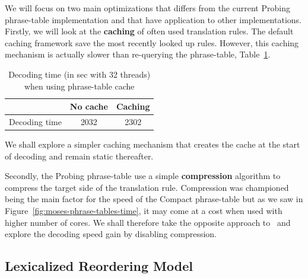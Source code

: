 \documentclass[11pt]{article}
\begin{document}
We will focus on two main optimizations that differs from the current Probing phrase-table implementation and that have application to other implementations. Firstly, we will look at the \textbf{caching} of often used translation rules. The default caching framework save the most recently looked up rules. However, this caching mechanism is actually slower than re-querying the phrase-table, Table~\ref{tab:phrase-table-cache}. 
\begin{table}[h]
\small
\begin{center}
\begin{tabular}{|l|c|c|} \hline
		& No cache	& Caching \\ \hline
Decoding time  	& 2032 		& 2302 \\ \hline
\end{tabular}
\end{center}
\caption{Decoding time (in sec with 32 threads) when using phrase-table cache}
\label{tab:phrase-table-cache}
\end{table}
We shall explore a simpler caching mechanism that creates the cache at the start of decoding and remain static thereafter.

Secondly, the Probing phrase-table use a simple \textbf{compression} algorithm to compress the target side of the translation rule. Compression was championed being the main factor for the speed of the Compact phrase-table but as we saw in Figure~\ref{fig:moses-phrase-tables-time}, it may come at a cost when used with higher number of cores. We shall therefore take the opposite approach to~ and explore the decoding speed gain by disabling compression.

\subsection{Lexicalized Reordering Model}
\end{document}
